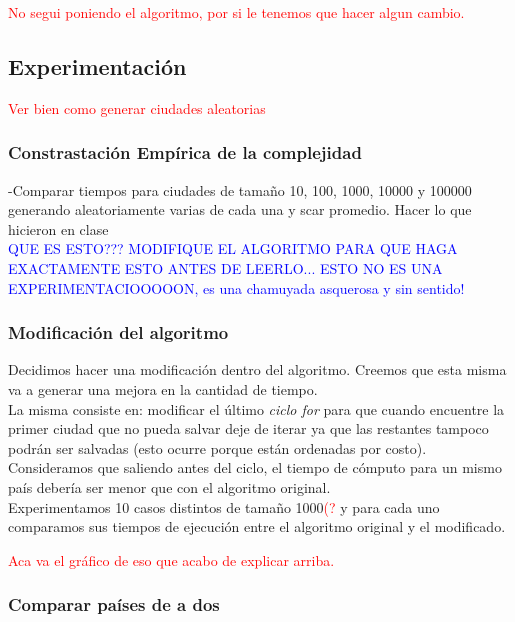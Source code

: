 \textcolor{red}{No segui poniendo el algoritmo, por si le tenemos que hacer algun cambio.}

\newpage
\subsection{Experimentaci\'on}

\textcolor{red}{Ver bien como generar ciudades aleatorias}
\subsubsection{Constrastaci\'on Emp\'irica de la complejidad}
-Comparar tiempos para ciudades de tama\~no 10, 100, 1000, 10000 y 100000 generando aleatoriamente varias de cada una y scar promedio. Hacer lo que hicieron en clase\\

\textcolor{blue}{QUE ES ESTO??? MODIFIQUE EL ALGORITMO PARA QUE HAGA EXACTAMENTE ESTO ANTES DE LEERLO... ESTO NO ES UNA EXPERIMENTACIOOOOON, es una chamuyada asquerosa y sin sentido!}

\subsubsection{Modificaci\'on del algoritmo}

Decidimos hacer una modificaci\'on dentro del algoritmo. Creemos que esta misma va a generar una mejora en la cantidad de tiempo.\\

La misma consiste en: modificar el \'ultimo \emph{ciclo for} para que cuando encuentre la primer ciudad que no pueda salvar deje de iterar ya que las restantes tampoco podr\'an ser salvadas (esto ocurre porque est\'an ordenadas por costo).\\

Consideramos que saliendo antes del ciclo, el tiempo de c\'omputo para un mismo pa\'is deber\'ia ser menor que con el algoritmo original.\\

Experimentamos 10 casos distintos de tama\~no 1000\textcolor{red}{(?} y para cada uno comparamos sus tiempos de ejecuci\'on entre el algoritmo original y el modificado.

\textcolor{red}{Aca va el gr\'afico de eso que acabo de explicar arriba.}

\subsubsection{Comparar pa\'ises de a dos}

